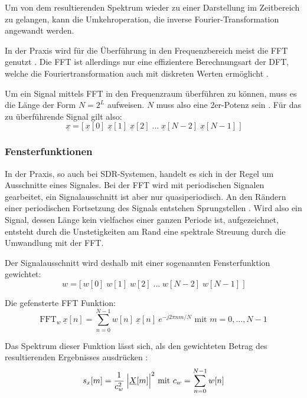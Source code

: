 Um von dem resultierenden Spektrum wieder zu einer Darstellung im Zeitbereich zu gelangen, kann die Umkehroperation, die inverse Fourier-Transformation angewandt werden.

In der Praxis wird für die Überführung in den Frequenzbereich meist die \ac{FFT} genutzt \cite[vgl. Heuberger, e. a., S. 14]{Heuberger:2017}. Die \ac{FFT} ist allerdings nur eine effizientere Berechnungsart der \ac{DFT}, welche die Fouriertransformation auch mit diskreten Werten ermöglicht \cite[vgl. Meyer, S. 175]{Meyer:2017}.

Um ein Signal mittels \ac{FFT} in den Frequenzraum überführen zu können, muss es die Länge der Form \(N = 2^L\) aufweisen. \(N\) muss also eine 2er-Potenz sein \cite[vgl. Heuberger, e. a., S. 15]{Heuberger:2017}.
Für das zu überführende Signal gilt also:
\[\underline{x} = \Big[ \:  \underline{x}[0] \; \underline{x}[1] \; \underline{x}[2] \; ... \; \underline{x}[N - 2] \; \underline{x}[N - 1] \; \Big] \]





\subsubsection{Fensterfunktionen}
In der Praxis, so auch bei \ac{SDR}-Systemen, handelt es sich in der Regel um Ausschnitte eines Signales. Bei der \ac{FFT} wird mit periodischen Signalen gearbeitet, ein Signalausschnitt ist aber nur quasiperiodisch. An den Rändern einer periodischen Fortsetzung des Signals entstehen Sprungstellen \cite[vgl. Meyer, S. 187]{Meyer:2017}.\newline
Wird also ein Signal, dessen Länge kein vielfaches einer ganzen Periode ist, aufgezeichnet, entsteht durch die Unstetigkeiten am Rand eine spektrale Streuung durch die Umwandlung mit der \ac{FFT}.

Der Signalausschnitt wird deshalb mit einer sogenannten Fensterfunktion gewichtet: 
\[w = \Big[ \:  w[0] \; w[1] \; w[2] \; ... \; w[N - 2] \; w[N - 1] \; \Big] \]


Die gefensterte FFT Funktion:
\[\text{FFT} _w \: {\underline{x}[n]} = \sum_{n=0}^{N-1} w[n] \: \underline{x}[n] \: e^{-j2\pi nm / N} \text{ mit } m = 0, ..., N-1\]


Das Spektrum dieser Funktion lässt sich, als den gewichteten Betrag des resultierenden Ergebnisses ausdrücken \cite[vgl. Heuberger, e. a., S. 14]{Heuberger:2017}:
\[s_x[m] = \frac{1}{c_w^2} \: \Big{|}\underline{X}[m]  \Big{|}^2 \text{ mit } c_w = \sum_{n=0}^{N-1} w[n] \]

